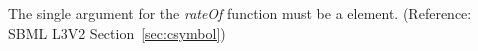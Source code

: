 The single argument for the \emph{rateOf}  function must be a  element.  (Reference: SBML L3V2 Section~\ref{sec:csymbol})

